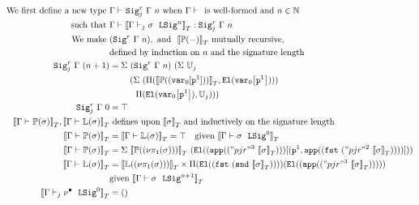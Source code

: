 \begin{align*}
  \text{We first define a new type }& \goodType{\Gamma}{\Sigr{\Gamma}{n}{j}}{}  \text{ when } \goodCtx{\Gamma}{}  \text{ is well-formed and } n \in \mathbb{N} \\
  \text{such that } &\goodTerm{\Gm}{\denotesT{\goodSigU{j}{\Gamma}{\lsig}{n}}}{\Sigr{\Gm}{n}{j}} \\
  \text{We make } & ({\Sigr{\Gamma}{n}{}}), \text{ and } \ \denotesT{\TyTkg {-}} \text{ mutually recursive, } \\
  & \text{defined by induction on $n$ and the signature length} \\  
  {\Sigr{\Gamma}{(n+1)}{j}} &= 
    \Sigma~(\Sigr{\Gamma}{n}{})
          ~(\Sigma~\cU_j \\
          & \quad \quad ~(\Sigma~(\TyPi{\denotesT{\TyTkg {(\var{0}[\SubstWeak{1}])}}}{\El{\sub{\var{0}}{\SubstWeak{1}}}}) \\
          & \quad \quad \quad \TyPi{\El{\sub{\var{0}}{\SubstWeak{1}}}}{\cU_j})) \\
  \Sigr{\Gamma}{0}{j} &= \top \\
  \denotesT{\goodType{\Gamma}{\TyTkg {\sigma}}{}}, \denotesT{\goodType{\Gamma}{\TyLkg{\sigma}}{}} &\text{ defines upon } \denotesT{\sigma} 
  \text{ and inductively on the signature length} \\
  \denotesT{\goodType{\Gamma}{\TyTkg {\sigma}}{}} &= \denotesT{\goodType{\Gamma}{\TyLkg{\sigma}}{}} = \top \quad
      \text{given } \denotesT{\goodSig{\Gamma}{\sigma}{0}} \\ 
  \denotesT{\goodType{\Gamma}{\TyTkg {\sigma}}{}} &= 
    \Sigma~\denotesT{\TyTkg {(\lsigproj{1}{\sigma})}}~(\El{(\app{("pjr"^3~\denotesT{\sigma})})[(\SubstWeak{1}, \app{(\fst{("pjr"^2~{\denotesT{\sigma}})})})]}) \\
  \denotesT{\goodType{\Gamma}{\TyLkg{\sigma}}{}} &=
  \denotesT{\TyLkg{(\lsigproj{1}{\sigma})}} \times \Pi(\El{(\fst{(\snd{\denotesT{\sigma}})})})(\El{(\app{("pjr"^3~\denotesT{\sigma})} )}) \\
  &\text{given } \denotesT{\goodSig{\Gamma}{\sigma}{n+1}} \\
  \denotesT{\goodSigU{j}{\Gamma}{\LSigEmp}{0}} &= \unit \\ 

\end{align*}
